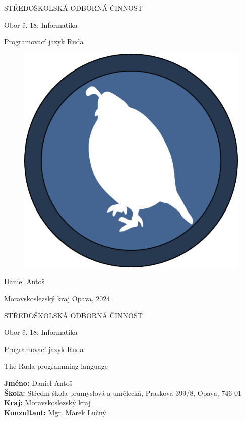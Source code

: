 \documentclass[12pt, a4paper,
twoside,        %
openright
]{report}
\title{\nazevPrace} %
\author{\jmenoAutora} %
\date{\datumOdevzdani} %
\newcommand\city{Opava} %
\newcommand\district{Moravskoslezský kraj} %
\newcommand\specialization{Obor č. 18: Informatika} %
\newcommand\school{ Střední škola průmyslová a umělecká, Praskova 399/8, Opava, 746 01} %
\newcommand\consultant{Mgr. Marek Lučný} %
\newcommand\authorName{Daniel Antoš}  %
\newcommand\publicationYear{2024} %
\newcommand\mainTitle{Programovací jazyk Ruda} %
\begin{document}
	
	\pagestyle{empty}
	
	\begin{titlepage}
		\bfseries{ %
			\begin{center}
				\LARGE{STŘEDOŠKOLSKÁ ODBORNÁ ČINNOST}
				
				\vspace{14pt}
				\large{ %
					\specialization
				} %
				
				\vspace{0.2 \textheight}
				
				\LARGE{ %
					\mainTitle
				}%
				
				\begin{figure}[h]
					\centering
					\includegraphics[width=0.3\linewidth]{image/logo.png} 
				\end{figure}
				
				\vspace{0.2\textheight}
			\end{center}
			
			\noindent\Large{\authorName} 
			
			\noindent\Large{\district {}  \city, \publicationYear} 
			
			
		} %
	\end{titlepage}
	
	\cleardoublepage
	
	{\bfseries %
		\begin{center}
			\LARGE{STŘEDOŠKOLSKÁ ODBORNÁ ČINNOST}
			
			\vspace{14pt}
			{\large %
				\specialization %
			} %
			
			\vspace{0.3 \textheight}
			
			\LARGE{ %
				\mainTitle
			}
			
			\LARGE{ %
				The Ruda programming language
			}%
			
			\vspace{0.24\textheight}
		\end{center}  
	}%
	{\Large %
		\noindent\textbf{Jméno:} \authorName\\
		\textbf{Škola:} \school\\
		\textbf{Kraj:} \district\\
		\textbf{Konzultant:} \consultant\\
	} %
	
\end{document}
